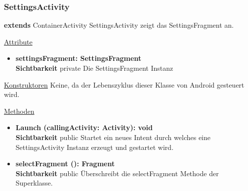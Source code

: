 \subsubsection{SettingsActivity}
\textbf{extends} ContainerActivity \newline
SettingsActivity zeigt das SettingsFragment an.
\newline

\underline{Attribute}
\begin{itemize}
\itemsep0pt
\item \textbf{settingsFragment: SettingsFragment} \hfill\\ 
\textbf{Sichtbarkeit} private\newline
Die SettingsFragment Instanz

\end{itemize}

\underline{Konstruktoren}\newline
\indent Keine, da der Lebenszyklus dieser Klasse von Android gesteuert wird.\newline

\underline{Methoden}
\begin{itemize}
\itemsep0pt

\item \textbf{Launch (callingActivity: Activity): void}\hfill\\
\textbf{Sichtbarkeit} public\newline
Startet ein neues Intent durch welches eine SettingsActivity Instanz erzeugt und gestartet wird.

\item \textbf{selectFragment (): Fragment}\hfill\\
\textbf{Sichtbarkeit} public\newline
Überschreibt die selectFragment Methode der Superklasse.

\end{itemize}